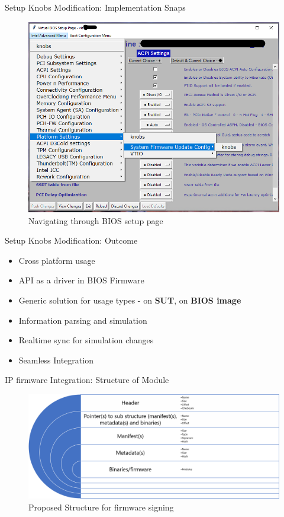 \begin{frame}[allowframebreaks]{Setup Knobs Modification: Implementation Snaps}
    \begin{figure}[htbp]
        \centering
        \includegraphics[width=0.6\linewidth]{Im/figures/proposed-work/bios-gui-accessing-menu}
        \caption{Navigating through BIOS setup page}\label{fig:proposed-work-bios-gui-accessing-menu}
    \end{figure}
\end{frame}

\begin{frame}{Setup Knobs Modification: Outcome}
    \begin{itemize}
        \item Cross platform usage
        \item API as a driver in BIOS Firmware
        \item Generic solution for usage types - on \textbf{SUT}, on \textbf{BIOS image}
        \item Information parsing and simulation
        \item Realtime sync for simulation changes
        \item Seamless Integration
    \end{itemize}
\end{frame}


\begin{frame}{IP firmware Integration: Structure of Module}
    \begin{figure}[htbp]
        \centering
        \includegraphics[width=0.9\linewidth]{Im/figures/proposed-work/proposed-structure-firmware-signing}
        \caption{Proposed Structure for firmware signing}\label{fig:proposed-work-proposed-structure-firmware-signing}
    \end{figure}
\end{frame}


